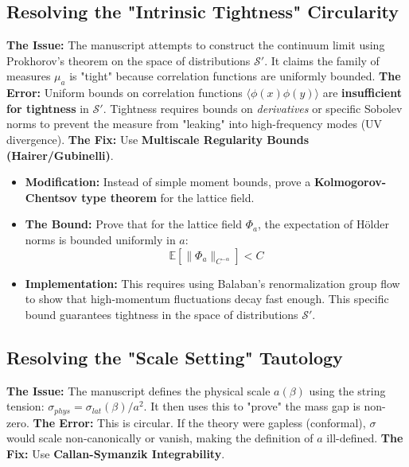 \subsection{Resolving the "Intrinsic Tightness" Circularity}
\textbf{The Issue:} The manuscript attempts to construct the continuum limit using Prokhorov's theorem on the space of distributions $\mathcal{S}'$. It claims the family of measures $\mu_a$ is "tight" because correlation functions are uniformly bounded.
\textbf{The Error:} Uniform bounds on correlation functions $\langle \phi(x) \phi(y) \rangle$ are \textbf{insufficient for tightness} in $\mathcal{S}'$. Tightness requires bounds on \textit{derivatives} or specific Sobolev norms to prevent the measure from "leaking" into high-frequency modes (UV divergence).
\textbf{The Fix:} Use \textbf{Multiscale Regularity Bounds (Hairer/Gubinelli)}.

\begin{itemize}
    \item \textbf{Modification:} Instead of simple moment bounds, prove a \textbf{Kolmogorov-Chentsov type theorem} for the lattice field.
    \item \textbf{The Bound:} Prove that for the lattice field $\Phi_a$, the expectation of Hölder norms is bounded uniformly in $a$:
    \begin{equation}
    \mathbb{E} [ \| \Phi_a \|_{C^{-\alpha}} ] < C
    \end{equation}
    \item \textbf{Implementation:} This requires using Balaban's renormalization group flow to show that high-momentum fluctuations decay fast enough. This specific bound guarantees tightness in the space of distributions $\mathcal{S}'$.
\end{itemize}

\subsection{Resolving the "Scale Setting" Tautology}
\textbf{The Issue:} The manuscript defines the physical scale $a(\beta)$ using the string tension: $\sigma_{phys} = \sigma_{lat}(\beta) / a^2$. It then uses this to "prove" the mass gap is non-zero.
\textbf{The Error:} This is circular. If the theory were gapless (conformal), $\sigma$ would scale non-canonically or vanish, making the definition of $a$ ill-defined.
\textbf{The Fix:} Use \textbf{Callan-Symanzik Integrability}.


